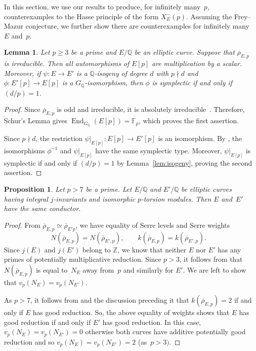 \documentclass[12pt]{amsart}
\numberwithin{equation}{section}
\newtheorem{lemma}[equation]{Lemma}
\newtheorem{proposition}[equation]{Proposition}
\theoremstyle{definition}
\newcommand{\F}{\mathbb{F}}
\newcommand{\Q}{\mathbb{Q}}
\newcommand{\Z}{\mathbb{Z}}
\newcommand{\rhobar}{{\overline{\rho}}}
\newcommand{\Xp}{X_E^{-}(p)}
\DeclareMathOperator{\End}{End}
\begin{document}
In this section, we use our results to produce, for infinitely many~$p$, counterexamples to the Hasse principle of the form $\Xp$. Assuming the Frey--Mazur conjecture, we further show there are counterexamples for infinitely many $E$ and~$p$.

\begin{lemma}\label{lem:irred}
Let $p \geq 3$ be a prime and $E/\Q$ be an elliptic curve.
Suppose that $\rhobar_{E,p}$ is irreducible.
Then all automorphisms of $E[p]$ are multiplication by a scalar.
Moreover, if $\psi : E\to E'$ is a  $\Q$-isogeny of degree $d$ with $p\nmid d $ and $\phi : E'[p] \to E[p]$ is a $G_\Q$-isomorphism, then $\phi$ is symplectic if and only if $(d/p)=1$.
\end{lemma}

\begin{proof}
Since $\overline{\rho}_{E,p}$ is odd and irreducible, it is absolutely
irreducible~\cite[Lemma~24]{DahmenThesis}.
Therefore, Schur's Lemma gives
$\End_{G_{\Q}}(E[p])=\F_p$,
which proves the first assertion.

Since $p\nmid d$, the restriction $\psi|_{E[p]}:E[p]\longrightarrow E'[p]$
is an isomorphism. By \cite[Lemma~6]{symplectic}, the isomorphisms
$\phi^{-1}$ and $\psi|_{E[p]}$ have the same symplectic type.
Moreover, $\psi|_{E[p]}$ is symplectic if and only if
$({d}/{p})=1$ by Lemma~\ref{lem:isogeny}, proving the second assertion.
\end{proof}

\begin{proposition} \label{prop:conductor}
Let $p > 7$ be a prime. Let $E/\Q$ and $E'/\Q$ be elliptic curves having integral $j$-invariants and isomorphic $p$-torsion modules. 
Then $E$ and~$E'$ have the same conductor.
\end{proposition}
\begin{proof}

From $\rhobar_{E,p} \simeq \rhobar_{E'p}$, we have equality of Serre levels and Serre weights
\[
 N(\rhobar_{E,p}) = N(\rhobar_{E',p}),  \qquad k(\rhobar_{E,p}) = k(\rhobar_{E',p}).
\]
Since $j(E)$ and $j(E')$ belong to $\Z$, we know that neither $E$ nor $E'$ has any primes of potentially multiplicative reduction. Since $p>3$, it follows from \cite[page~28]{Kraus1997} that $N(\rhobar_{E,p})$ is equal to~$N_E$ away from~$p$ and similarly for $E'$. We are left to show that
$v_p(N_E) = v_p(N_{E'})$.

As $p > 7$, it follows from \cite[Th\'eor\`eme 1]{Kraus1997} and the discussion preceding it that  $k(\rhobar_{E,p}) = 2$ if and only if $E$ has good reduction. So, the above equality of weights shows that $E$ has good reduction if and only if $E'$ has good reduction. In this case, $v_p(N_E) = v_p(N_{E'})=0$ otherwise both curves have additive potentially good reduction and so $v_p(N_E) = v_p(N_{E'})=2$ (as~$p > 3)$.
\end{proof}
\end{document}
